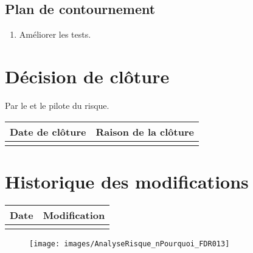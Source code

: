 \flushleft
\subsection*{Plan de contournement}

\begin{enumerate}
	\item Améliorer les tests. 
\end{enumerate}

\section*{Décision de clôture}
Par le \CP{} et le pilote du risque.
\begin{table}[H]
\centering
	\begin{tabularx}{16.8cm}{|X|X|}
	\hline
	\rowcolor{gray!40} Date de clôture & Raison de la clôture \\
	\hline
	  & \\
	\hline
	\end{tabularx}
\end{table}

\section*{Historique des modifications}
\begin{table}[H]
\centering
	\begin{tabularx}{16.8cm}{|X|X|}
	\hline
	Date & Modification \\
	\hline
	  & \\
	\hline
	\end{tabularx}
\end{table}
\newpage

\begin{landscape}
\begin{figure}
	\centering
	\texttt{[image: images/AnalyseRisque\_nPourquoi\_FDR013]}
\end{figure}
\end{landscape}